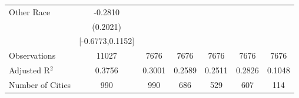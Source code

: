 \documentclass{article}
\begin{document}
\begin{table}[htbp]
\begin{tabular}{l*{6}{c}}
Other Race          &     -0.2810   &               &               &               &               &               \\
                    &    (0.2021)   &               &               &               &               &               \\
                    &[-0.6773,0.1152]   &               &               &               &               &               \\
\midrule
Observations        &       11027   &        7676   &        7676   &        7676   &        7676   &        7676   \\
Adjusted R$^2$      &      0.3756   &      0.3001   &      0.2589   &      0.2511   &      0.2826   &      0.1048   \\
Number of Cities    &         990   &         990   &         686   &         529   &         607   &         114   \\
\bottomrule
\end{tabular}
\end{table}
\end{document}
